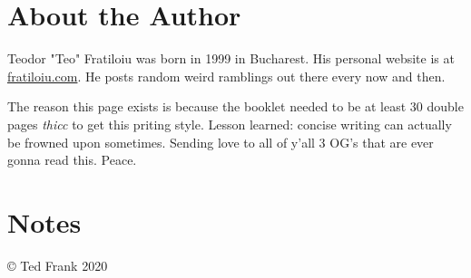 \documentclass[11pt]{report}
\begin{document}
\newpage
\pagestyle{plain}

\newpage
\thispagestyle{empty}
\mbox{}
\newpage

\newpage
{}
\listoffigures
\newpage
{}
\listoftables

\newpage
\mbox{}
\newpage
\newpage
{}
\printbibliography

\newpage
\mbox{}
\newpage

\newpage
\section*{About the Author}
Teodor "Teo" Fratiloiu was born in 1999 in Bucharest. His personal website is at \href{fratiloiu.com}{fratiloiu.com}. He posts random weird ramblings out there every now and then. 
\par
The reason this page exists is because the booklet needed to be at least 30 double pages \textit{thicc} to get this priting style. Lesson learned: concise writing can actually be frowned upon sometimes. Sending love to all of y'all 3 OG's that are ever gonna read this. Peace.

\newpage
\mbox{}
\newpage


\newpage
\section*{Notes}
\newpage
\mbox{}
\newpage
\mbox{}
\newpage
\thispagestyle{empty}
\vspace*{\fill}
\centering
© Ted Frank 2020
\end{document}
